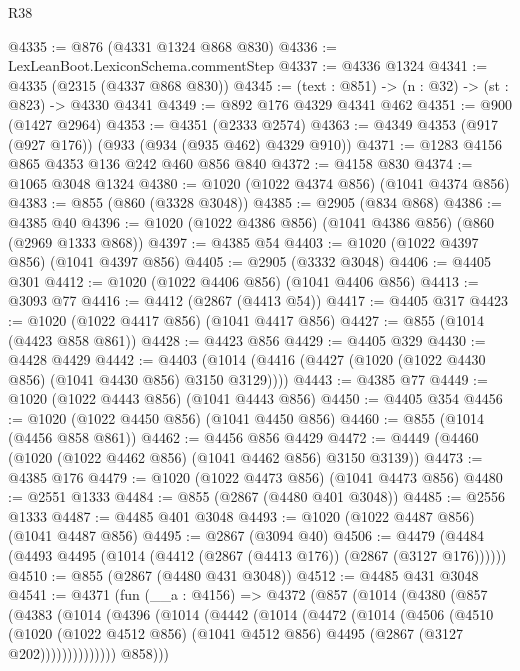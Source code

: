\begin{lexlean}{R38}
\begin{coremodule}
@4335 := @876 (@4331 @1324 @868 @830)
@4336 := LexLeanBoot.LexiconSchema.commentStep
@4337 := @4336 @1324
@4341 := @4335 (@2315 (@4337 @868 @830))
@4345 := (text : @851) -> (n : @32) -> (st : @823) -> @4330 @4341
@4349 := @892 @176 @4329 @4341 @462
@4351 := @900 (@1427 @2964)
@4353 := @4351 (@2333 @2574)
@4363 := @4349 @4353 (@917 (@927 @176)) (@933 (@934 (@935 @462) @4329 @910))
@4371 := @1283 @4156 @865 @4353 @136 @242 @460 @856 @840
@4372 := @4158 @830
@4374 := @1065 @3048 @1324
@4380 := @1020 (@1022 @4374 @856) (@1041 @4374 @856)
@4383 := @855 (@860 (@3328 @3048))
@4385 := @2905 (@834 @868)
@4386 := @4385 @40
@4396 := @1020 (@1022 @4386 @856) (@1041 @4386 @856) (@860 (@2969 @1333 @868))
@4397 := @4385 @54
@4403 := @1020 (@1022 @4397 @856) (@1041 @4397 @856)
@4405 := @2905 (@3332 @3048)
@4406 := @4405 @301
@4412 := @1020 (@1022 @4406 @856) (@1041 @4406 @856)
@4413 := @3093 @77
@4416 := @4412 (@2867 (@4413 @54))
@4417 := @4405 @317
@4423 := @1020 (@1022 @4417 @856) (@1041 @4417 @856)
@4427 := @855 (@1014 (@4423 @858 @861))
@4428 := @4423 @856
@4429 := @4405 @329
@4430 := @4428 @4429
@4442 := @4403 (@1014 (@4416 (@4427 (@1020 (@1022 @4430 @856) (@1041 @4430 @856) @3150 @3129))))
@4443 := @4385 @77
@4449 := @1020 (@1022 @4443 @856) (@1041 @4443 @856)
@4450 := @4405 @354
@4456 := @1020 (@1022 @4450 @856) (@1041 @4450 @856)
@4460 := @855 (@1014 (@4456 @858 @861))
@4462 := @4456 @856 @4429
@4472 := @4449 (@4460 (@1020 (@1022 @4462 @856) (@1041 @4462 @856) @3150 @3139))
@4473 := @4385 @176
@4479 := @1020 (@1022 @4473 @856) (@1041 @4473 @856)
@4480 := @2551 @1333
@4484 := @855 (@2867 (@4480 @401 @3048))
@4485 := @2556 @1333
@4487 := @4485 @401 @3048
@4493 := @1020 (@1022 @4487 @856) (@1041 @4487 @856)
@4495 := @2867 (@3094 @40)
@4506 := @4479 (@4484 (@4493 @4495 (@1014 (@4412 (@2867 (@4413 @176)) (@2867 (@3127 @176))))))
@4510 := @855 (@2867 (@4480 @431 @3048))
@4512 := @4485 @431 @3048
@4541 := @4371
    (fun (__a : @4156) =>
    @4372
      (@857
        (@1014
          (@4380
            (@857
              (@4383
                (@1014
                  (@4396
                    (@1014
                      (@4442
                        (@1014
                          (@4472
                            (@1014
                              (@4506
                                (@4510
                                  (@1020
                                    (@1022 @4512 @856)
                                    (@1041 @4512 @856)
                                    @4495
                                    (@2867 (@3127 @202))))))))))))))
            @858)))

\end{coremodule}
\end{lexlean}
